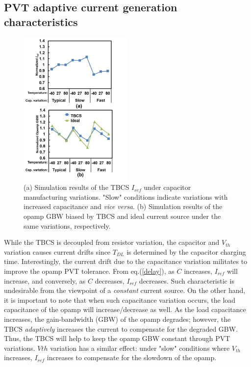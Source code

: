 \documentclass[letterpaper, 10 pt, conference]{ieeeconf}  %
\begin{document}
\subsection{PVT adaptive current generation characteristics}
\begin{figure}[!]
\centering
 \includegraphics[width=0.5\textwidth]{figs/iref_var.png}
  \caption{(a) Simulation results of the TBCS $I_{ref}$ under capacitor manufacturing variations. "Slow" conditions indicate variations with increased capacitance and \textit{vice versa}.  (b) Simulation results of the opamp GBW biased by TBCS and ideal current source under the same variations, respectively.}
\label{cvar}
\end{figure}

While the TBCS is decoupled from resistor variation, the capacitor and $V_{th}$ variation causes current drifts since $T_{DL}$ is determined by the capacitor charging time. Interestingly, the current drift due to the capacitance variation militates to improve the opamp PVT tolerance.
From eq.(\ref{delay}), as $C$ increases, $I_{ref}$ will increase, and conversely, as $C$ decreases, $I_{ref}$ decreases. Such characteristic is undesirable from the viewpoint of a \textit{constant} current source. On the other hand, it is important to note that when such capacitance variation occurs, the load capacitance of the opamp will increase/decrease as well. As the load capacitance increases, the gain-bandwidth (GBW) of the opamp degrades; however, the TBCS \textit{adaptively} increases the current to compensate for the degraded GBW. Thus, the TBCS will help to keep the opamp GBW constant through PVT variations. $V{th}$ variation has a similar effect: under "slow" conditions where $V_{th}$ increases, $I_{ref}$ increases to compensate for the slowdown of the opamp.
\end{document}
